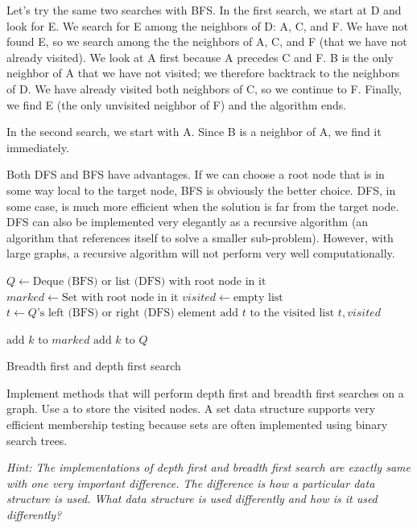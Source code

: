 Let's try the same two searches with BFS.
In the first search, we start at D and look for E.
We search for E among the neighbors of D: A, C, and F.
We have not found E, so we search among the the neighbors of A, C, and F (that we have not already visited).
We look at A first because A precedes C and F.
B is the only neighbor of A that we have not visited; we therefore backtrack to the neighbors of D.
We have already visited both neighbors of C, so we continue to F. Finally, we find E (the only unvisited neighbor of F) and the algorithm ends.

In the second search, we start with A.
Since B is a neighbor of A, we find it immediately.

Both DFS and BFS have advantages.
If we can choose a root node that is in some way local to the target node, BFS is obviously the better choice.
DFS, in some case, is much more efficient when the solution is far from the target node.
DFS can also be implemented very elegantly as a recursive algorithm (an algorithm that references itself to solve a smaller sub-problem).
However, with large graphs, a recursive algorithm will not perform very well computationally.

\begin{algorithm}
\begin{algorithmic}[1]
	\State $Q \gets \text{Deque (BFS) or list (DFS) with root node in it}$	
	\State $marked \gets \text{Set with root node in it}$	
	\State $visited \gets \text{empty list}$	
							
		\State $t \gets Q\text{'s left (BFS) or right (DFS) element}$	
		\State $\text{add }t \text{ to the visited list}$
									
			\State {} $t,visited$
		
		\Else										{}
					\State $\text{add } k \text{ to } marked$
					\State $\text{add } k \text{ to } Q$
				\EndIf
			\EndFor
		\EndIf
	\EndWhile
\EndProcedure
\end{algorithmic}
\caption{Breadth first and depth first search}
\label{alg:BFSDFS}
\end{algorithm}

\begin{problem}
Implement methods that will perform depth first and breadth first searches on a graph.
Use a  to store the visited nodes.
A set data structure supports very efficient membership testing because
sets are often implemented using binary search trees.

\textit{Hint: The implementations of depth first and breadth first search are exactly same with one very important difference.
The difference is how a particular data structure is used.  What data structure is used differently and how is it used differently?}
\end{problem}

